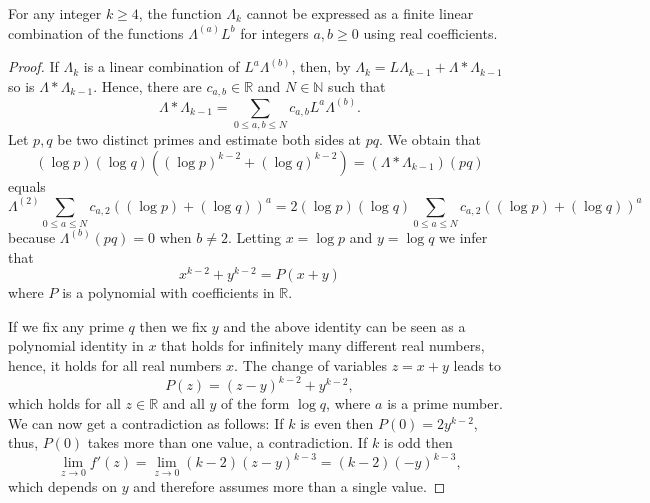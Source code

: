 \documentclass[10pt,a4paper]{amsart}
\renewcommand{\geq}{\geqslant}
\renewcommand{\leq}{\leqslant}
\begin{document}
\begin{lemma} \label{paparity}For any integer $k \geq 4$, 
the  function $\Lambda_k$ cannot be expressed as a finite linear combination of the functions $\Lambda^{(a)}L^b$ for integers 
$a,b\geq 0$
using real coefficients.
\end{lemma}

\begin{proof}  If $\Lambda_k$ is a  
linear combination of 
$L^a \Lambda^{(b)}$, then, by 
$\Lambda_k=L \Lambda_{k-1} + \Lambda \ast \Lambda_{k-1}$
so is $\Lambda \ast \Lambda_{k-1}$.
Hence, there are $c_{a,b}\in \mathbb R$ and $N\in \mathbb N$ 
such that 
$$\Lambda \ast \Lambda_{k-1} = \sum_{0\leq a,b \leq N} c_{a,b}
L^a \Lambda^{(b)}.$$ Let $p,q$ be two distinct primes
and estimate both sides at $pq$. We obtain that 
$$ (\log p)(\log q)((\log p)^{k-2} + (\log q)^{k-2})
 =
 (\Lambda \ast \Lambda_{k-1})(pq)$$ equals $$
 \Lambda^{(2)}
\sum_{0\leq a \leq N} c_{a,2} ( (\log p)+(\log q))^a 
=2 (\log p)(\log q)
\sum_{0\leq a \leq N} c_{a,2} ( (\log p)+(\log q))^a$$
because $\Lambda^{(b)}(pq)=0$ when $b\neq 2 $. Letting 
$x=\log p$ and $ y=\log q$ we infer that $$x^{k-2} + y^{k-2}= P(x+y)
$$ where $P$ is a polynomial with coefficients in $\mathbb R$.  


If we fix any prime $q$ then we fix $y$
and the above identity can be seen 
as a polynomial identity in $x$ that holds for infinitely many 
different real numbers, hence, it holds for all real numbers $x$.
The change of variables  $z=x+y$ leads to  
$$P(z)=(z-y)^{k-2}+ y^{k-2},$$ which holds for all $z\in \mathbb R$ 
and all $y$ of the form $\log q$, where $a$ is a prime number.
We can now get a contradiction as follows:
If $k$ is even then $P(0)= 2 y^{k-2}$, 
thus, $P(0)$ takes more than one value,
a contradiction. If $k$ is odd   
then 
$$ \lim_{z\to 0} f'(z)=\lim_{z\to 0} 
(k-2)(z-y)^{k-3}
=(k-2)(-y)^{k-3},$$
which depends on $y$ and   therefore assumes more than 
a single value.\end{proof}
\end{document}
